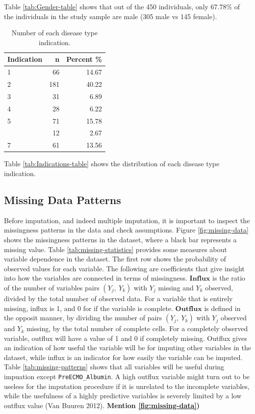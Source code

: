 \documentclass[12pt,]{article}
\begin{document}
Table \ref{tab:Gender-table} shows that out of the 450 individuals, only
67.78\% of the individuals in the study sample are male (305 male vs 145
female).

\begin{table}[!h]

\caption{\label{tab:Indications-table}\label{tab:sum3} Number of each disease type indication.}
\centering
\fontsize{10}{12}\selectfont
\begin{tabular}{lrr}
\toprule
Indication & n & Percent \%\\
\midrule
1 & 66 & 14.67\\
2 & 181 & 40.22\\
3 & 31 & 6.89\\
4 & 28 & 6.22\\
5 & 71 & 15.78\\
\addlinespace
6 & 12 & 2.67\\
7 & 61 & 13.56\\
\bottomrule
\end{tabular}
\end{table}

Table \ref{tab:Indications-table} shows the distribution of each disease
type indication.

\subsection{Missing Data Patterns}\label{missing-data-patterns}

Before imputation, and indeed multiple imputation, it is important to
inspect the missingness patterns in the data and check assumptions.
Figure \ref{fig:missing-data} shows the missingness patterns in the
dataset, where a black bar represents a missing value. Table
\ref{tab:missing-statistics} provides some measures about variable
dependence in the dataset. The first row shows the probability of
observed values for each variable. The following are coefficients that
give insight into how the variables are connected in terms of
missingness. \(\mathbf{Influx}\) is the ratio of the number of variables
pairs \((Y_j, ~Y_k)\) with \(Y_j\) missing and \(Y_k\) observed, divided
by the total number of observed data. For a variable that is entirely
missing, influx is 1, and 0 for if the variable is complete.
\(\mathbf{Outflux}\) is defined in the opposit manner, by dividing the
number of pairs \((Y_j, ~Y_k)\) with \(Y_j\) observed and \(Y_k\)
missing, by the total number of complete cells. For a completely
observed variable, outflux will have a value of 1 and 0 if completely
missing. Outflux gives an indication of how useful the variable will be
for imputing other variables in the dataset, while influx is an
indicator for how easily the variable can be imputed. Table
\ref{tab:missing-patterns} shows that all variables will be useful
during impuation except \texttt{PreECMO\_Albumin}. A high outflux
variable might turn out to be useless for the imputation procedure if it
is unrelated to the incomplete variables, while the usefulness of a
highly predictive variables is severely limited by a low outflux value
(Van Buuren 2012). \textbf{Mention \ref{fig:missing-data})}
\end{document}
